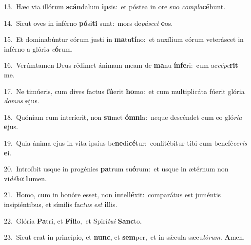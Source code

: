 {\numbfont\textcolor{\numbcolor}{13.}}~Hæc via illórum \textbf{scán}\-dalum \textbf{ip}\-sis:~\star et póstea in ore suo \textit{com}\-\textit{pla}\textbf{cé}bunt.\par
{\numbfont\textcolor{\numbcolor}{14.}}~Sicut oves in inférno \textbf{pó}\-si\textbf{ti} sunt:~\star mors de\-\textit{pá}\-\textit{scet} \textbf{e}\-os.\par
{\numbfont\textcolor{\numbcolor}{15.}}~Et dominabúntur eórum justi in \textbf{ma}\-tu\-\textbf{tí}\-no:~\star et auxílium eórum veteráscet in inférno a glóri\textit{a} \textit{e}\-\textbf{ó}rum.\par
{\numbfont\textcolor{\numbcolor}{16.}}~Verúmtamen Deus rédimet ánimam meam de \textbf{ma}\-nu \textbf{ín}\-\textbf{fe}ri:~\star cum ac\-\textit{cé}\-\textit{pe}\textbf{rit} me.\par
{\numbfont\textcolor{\numbcolor}{17.}}~Ne timúeris, cum dives factus \textbf{fú}\-erit \textbf{ho}\-mo:~\star et cum multiplicáta fúerit glória \textit{do}\-\textit{mus} \textbf{e}\-jus.\par
{\numbfont\textcolor{\numbcolor}{18.}}~Quóniam cum interíerit, non \textbf{su}\-met \textbf{óm}\-\textbf{ni}a:~\star neque descéndet cum eo gló\-\textit{ri}\-\textit{a} \textbf{e}\-jus.\par
{\numbfont\textcolor{\numbcolor}{19.}}~Quia ánima ejus in vita ipsíus be\-\textbf{ne}\-di\-\textbf{cé}\-tur:~\star confitébitur tibi cum benefé\-\textit{ce}\-\textit{ris} \textbf{e}\-i.\par
{\numbfont\textcolor{\numbcolor}{20.}}~Introíbit usque in progénies \textbf{pa}\-trum su\-\textbf{ó}\-rum:~\star et usque in ætérnum non vi\-\textit{dé}\-\textit{bit} \textbf{lu}\-men.\par
{\numbfont\textcolor{\numbcolor}{21.}}~Homo, cum in honóre esset, non \textbf{in}\-tel\-\textbf{lé}\-xit:~\star comparátus est juméntis insipiéntibus, et símilis fac\textit{tus} \textit{est} \textbf{il}\-lis.\par
{\numbfont\textcolor{\numbcolor}{22.}}~Glória \textbf{Pa}\-tri, et \textbf{Fí}\-\textbf{li}o,~\star et Spirí\-\textit{tu}\-\textit{i} \textbf{Sanc}\-to.\par
{\numbfont\textcolor{\numbcolor}{23.}}~Sicut erat in princípio, et \textbf{nunc}\-, et \textbf{sem}\-per,~\star et in sǽcula sæcu\-\textit{ló}\-\textit{rum}. \textbf{A}\-men.\par
